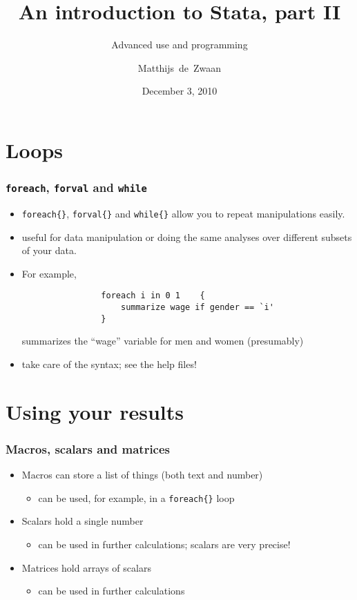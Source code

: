\documentclass[pdftex, compress]{beamer}
\title{An introduction to Stata, part II}
\subtitle{Advanced use and programming}
\author{Matthijs~de~Zwaan}
\institute{ACED}
\date{December 3, 2010}
\begin{document}
\begin{frame}
\titlepage
\end{frame}
\begin{frame}
\tableofcontents
\end{frame}
\section{Loops}

\begin{frame}[fragile]
\frametitle{\texttt{foreach}, \texttt{forval} and \texttt{while}}
	\begin{itemize}
		\item \texttt{foreach\{\}}, \texttt{forval\{\}} and \texttt{while\{\}} allow you to repeat manipulations easily.
		\item useful for data manipulation or doing the same analyses over different subsets of your data.  
		\item For example, \\
			\begin{Verbatim}
				foreach i in 0 1	{
					summarize wage if gender == `i'
				}
			\end{Verbatim}
			summarizes the ``wage'' variable for men and women (presumably)
		\item take care of the syntax; see the help files!
	\end{itemize}
\end{frame}

\section{Using your results}

\begin{frame}
\frametitle{Macros, scalars and matrices}
	\begin{itemize}
		\item Macros can store a list of things (both text and number)
		\begin{itemize}
			\item can be used, for example, in a \texttt{foreach\{\}} loop
		\end{itemize}
		\item Scalars hold a single number
		\begin{itemize}
			\item can be used in further calculations; scalars are very precise!
		\end{itemize}
		\item Matrices hold arrays of scalars
		\begin{itemize}
			\item can be used in further calculations
		\end{itemize}		
	\end{itemize}
\end{frame}
\end{document}
